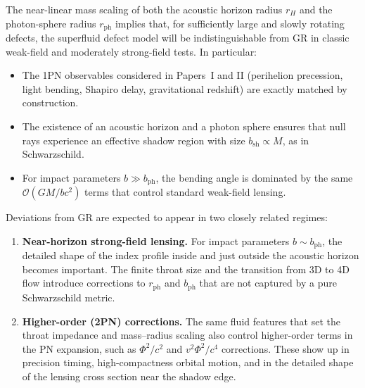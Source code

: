 \documentclass[11pt]{article}
\begin{document}
The near-linear mass scaling of both the acoustic horizon radius \(r_H\) and
the photon-sphere radius \(r_{\text{ph}}\) implies that, for sufficiently
large and slowly rotating defects, the superfluid defect model will be
indistinguishable from GR in classic weak-field and moderately strong-field
tests.  In particular:
\begin{itemize}
  \item The 1PN observables considered in Papers~I and II (perihelion
        precession, light bending, Shapiro delay, gravitational redshift)
        are exactly matched by construction.
  \item The existence of an acoustic horizon and a photon sphere ensures
        that null rays experience an effective shadow region with size
        \(b_{\text{sh}} \propto M\), as in Schwarzschild.
  \item For impact parameters \(b \gg b_{\text{ph}}\), the bending angle is
        dominated by the same \(\mathcal{O}(G M / b c^2)\) terms that
        control standard weak-field lensing.
\end{itemize}
Deviations from GR are expected to appear in two closely related regimes:
\begin{enumerate}
  \item \textbf{Near-horizon strong-field lensing.}  For impact parameters
        \(b \sim b_{\text{ph}}\), the detailed shape of the index profile
        inside and just outside the acoustic horizon becomes important.
        The finite throat size and the transition from 3D to 4D flow
        introduce corrections to \(r_{\text{ph}}\) and \(b_{\text{ph}}\)
        that are not captured by a pure Schwarzschild metric.
  \item \textbf{Higher-order (2PN) corrections.}  The same fluid features
        that set the throat impedance and mass--radius scaling also control
        higher-order terms in the PN expansion, such as \(\Phi^2/c^2\) and
        \(v^2 \Phi^2 / c^4\) corrections.  These show up in precision
        timing, high-compactness orbital motion, and in the detailed shape
        of the lensing cross section near the shadow edge.
\end{enumerate}
\end{document}
